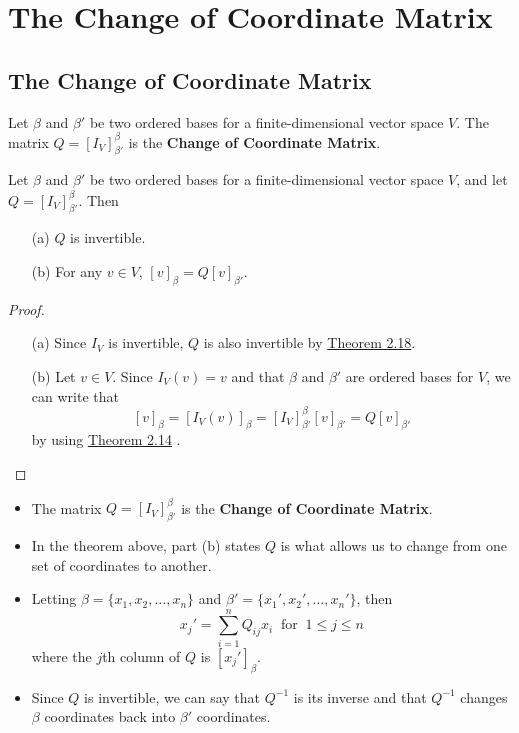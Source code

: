 \section{The Change of Coordinate Matrix}

\subsection{The Change of Coordinate Matrix}

\begin{definition}
    Let \( \beta \) and \( \beta'  \) be two ordered bases for a finite-dimensional vector space \( V  \). The matrix \( Q = [{I}_{V}]_{\beta'}^{\beta}  \) is the \textbf{Change of Coordinate Matrix}.
\end{definition}

\begin{theorem}
   Let \( \beta  \) and \( \beta'  \) be two ordered bases for a finite-dimensional vector space \( V  \), and let \( Q = [{I}_{V}]_{\beta'}^{\beta}  \). Then
   \begin{enumerate}
       \item[(a)] \( Q  \) is invertible.
        \item[(b)] For any \( v \in V  \), \( [v]_{\beta} = Q [v]_{\beta'} \).
   \end{enumerate}
\end{theorem}
\begin{proof}
\begin{enumerate}
    \item[(a)] Since \( {I}_{V}  \) is invertible, \( Q \) is also invertible by {\hyperref[Theorem 2.18]{Theorem 2.18}}. 
    \item[(b)] Let \( v \in V  \). Since \( {I}_{V}(v) = v  \) and that \( \beta  \) and \( \beta' \) are ordered bases for \( V  \), we can write that
        \[  [v]_{\beta} = [{I}_{V}(v)]_{\beta} = [{I}_{V}]_{\beta'}^{\beta} [v]_{\beta'} = Q [v]_{\beta'}    \]
        by using {\hyperref[Theorem 2.14]{Theorem 2.14}} .
\end{enumerate}
\end{proof}

\begin{itemize}
    \item The matrix \( Q = [{I}_{V}]_{\beta'}^{\beta}  \) is the \textbf{Change of Coordinate Matrix}. 
    \item In the theorem above, part (b) states \( Q  \) is what allows us to change from one set of coordinates to another.
    \item Letting \( \beta = \{ {x}_{1}, {x}_{2}, \dots, {x}_{n} \}  \) and \( \beta' = \{ {x}_{1}', {x}_{2}', \dots, {x}_{n}' \}  \), then
        \[  {x}_{j}' = \sum_{ i=1 }^{ n } {Q}_{ij} {x}_{i} \ \text{ for } \ 1 \leq j \leq n  \]
        where the \(j  \)th column of \( Q  \) is \(  [{x}_{j}']_{\beta}\).
    \item Since \( Q  \) is invertible, we can say that \( Q^{-1} \) is its inverse and that \( Q^{-1} \) changes \( \beta  \) coordinates back into \( \beta'  \) coordinates.
\end{itemize}

